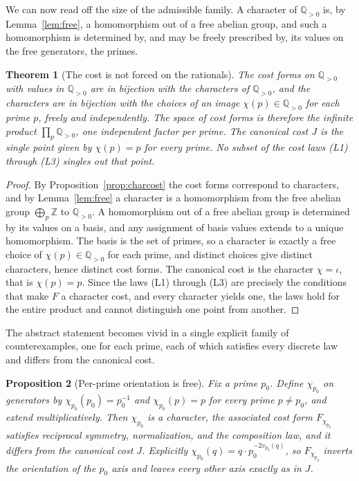 \documentclass[11pt,a4paper]{article}
\newtheorem{theorem}{Theorem}[section]
\newtheorem{proposition}[theorem]{Proposition}
\theoremstyle{definition}
\theoremstyle{remark}
\newcommand{\Qpos}{\mathbb{Q}_{>0}}
\begin{document}
We can now read off the size of the admissible family. A character of $\Qpos$ is,
by Lemma~\ref{lem:free}, a homomorphism out of a free abelian group, and such a
homomorphism is determined by, and may be freely prescribed by, its values on the
free generators, the primes.

\begin{theorem}[The cost is not forced on the rationals]\label{thm:negative}
The cost forms on $\Qpos$ with values in $\Qpos$ are in bijection with the
characters of $\Qpos$, and the characters are in bijection with the choices of an
image $\chi(p) \in \Qpos$ for each prime $p$, freely and independently. The space
of cost forms is therefore the infinite product $\prod_{p} \Qpos$, one
independent factor per prime. The canonical cost $J$ is the single point given by
$\chi(p) = p$ for every prime. No subset of the cost laws (L1) through (L3)
singles out that point.
\end{theorem}

\begin{proof}
By Proposition~\ref{prop:charcost} the cost forms correspond to characters, and by
Lemma~\ref{lem:free} a character is a homomorphism from the free abelian group
$\bigoplus_p \mathbb{Z}$ to $\Qpos$. A homomorphism out of a free abelian group is
determined by its values on a basis, and any assignment of basis values extends
to a unique homomorphism. The basis is the set of primes, so a character is
exactly a free choice of $\chi(p) \in \Qpos$ for each prime, and distinct choices
give distinct characters, hence distinct cost forms. The canonical cost is the
character $\chi = \iota$, that is $\chi(p) = p$. Since the laws (L1) through (L3)
are precisely the conditions that make $F$ a character cost, and every character
yields one, the laws hold for the entire product and cannot distinguish one point
from another.
\end{proof}

The abstract statement becomes vivid in a single explicit family of
counterexamples, one for each prime, each of which satisfies every discrete law
and differs from the canonical cost.

\begin{proposition}[Per-prime orientation is free]\label{prop:twist}
Fix a prime $p_0$. Define $\chi_{p_0}$ on generators by $\chi_{p_0}(p_0) = p_0^{-1}$
and $\chi_{p_0}(p) = p$ for every prime $p \neq p_0$, and extend multiplicatively.
Then $\chi_{p_0}$ is a character, the associated cost form $F_{\chi_{p_0}}$
satisfies reciprocal symmetry, normalization, and the composition law, and it
differs from the canonical cost $J$. Explicitly $\chi_{p_0}(q) = q \cdot p_0^{-2 v_{p_0}(q)}$,
so $F_{\chi_{p_0}}$ inverts the orientation of the $p_0$ axis and leaves every
other axis exactly as in $J$.
\end{proposition}
\end{document}
